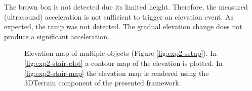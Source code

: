 The brown box is not detected due its limited height.
Therefore, the measured (ultrasound) acceleration is not sufficient to trigger an elevation event.
As expected, the ramp was not detected.
The gradual elevation change does not produce a significant acceleration.

\begin{figure}[htb!]
  \begin{center}

 \end{center}
  \caption{Elevation map of multiple objects (Figure \ref{fig:exp2-setup}). In \ref{fig:exp2-stair-plot} a contour map of the elevation is plotted. In \ref{fig:exp2-stair-map} the elevation map is rendered using the 3DTerrain component of the presented framework.}
  \label{fig:exp2-2-results}
\end{figure}